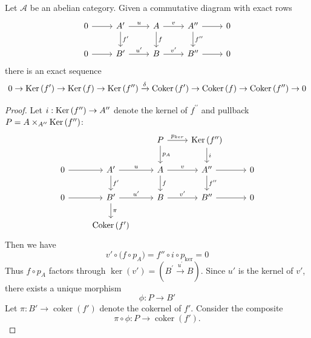 \documentclass[12pt, oneside]{book}
\begin{document}
\begin{lemma}
    \label{lem: snake's lemma}
    Let $\mathcal{A}$ be an abelian category. Given a commutative diagram with exact rows
    \begin{equation*}
        \begin{tikzcd}
            0 \arrow[r] & A' \arrow[r,"u"] \arrow[d,"f^\prime"] & A \arrow[r,"v"]\arrow[d,"f"]  & A^{\prime\prime} \arrow[d,"f^{\prime\prime}"] \arrow[r] & 0 \\
            0 \arrow[r] & B^\prime  \arrow[r,"u^{\prime}"]  & B \arrow[r,"v^{\prime}"]  & B^{\prime\prime} \arrow[r] & 0
        \end{tikzcd}
    \end{equation*}
    there is an exact sequence
    \begin{equation*}
        0 \rightarrow \operatorname{\operatorname{Ker}}\left(f^\prime\right) \rightarrow \operatorname{\operatorname{Ker}}\left(f\right) \rightarrow \operatorname{\operatorname{Ker}}\left(f^{\prime\prime}\right) \xrightarrow{\delta} \operatorname{\operatorname{Coker}}\left(f^\prime\right) \rightarrow \operatorname{\operatorname{Coker}}\left(f\right) \rightarrow \operatorname{\operatorname{Coker}}\left(f^{\prime\prime}\right) \rightarrow 0
    \end{equation*}
    \begin{proof}
        Let $i: \operatorname{\operatorname{Ker}}\left( f^{\prime\prime} \right) \rightarrow A^{\prime\prime}$ denote the kernel of $f^{\prime\prime}$ and
        pullback $P=A\times_{A^{\prime\prime}} \operatorname{\operatorname{Ker}}\left( f^{\prime\prime} \right)$:
        \begin{equation*}
            \begin{tikzcd}
                &&P\arrow[d,"p_A"]\arrow[r,"p_{ker}"]& \Ker\left( f^{\prime\prime} \right) \arrow[d,"i"]&\\
                0 \arrow[r] & A' \arrow[r,"u"] \arrow[d,"f^\prime"] & A \arrow[r,"v"]\arrow[d,"f"]  & A^{\prime\prime} \arrow[d,"f^{\prime\prime}"] \arrow[r] & 0 \\
                0 \arrow[r] & B^\prime \arrow[d,"\pi"]  \arrow[r,"u^{\prime}"]  & B \arrow[r,"v^{\prime}"]  & B^{\prime\prime} \arrow[r] & 0\\
                &\Coker\left( f^\prime \right)&&&
            \end{tikzcd}
        \end{equation*}
        Then we have
        \[
            v' \circ \bigl( f \circ p_A \bigr)
            = f'' \circ  i \circ p_{\ker}
            = 0
        \]
        Thus $f \circ p_A$ factors through $\ker(v') = \left(B^\prime \xrightarrow{u^\prime}B\right)$.
        Since $u'$ is the kernel of $v'$, there exists a unique morphism
        \[
            \phi : P \longrightarrow B'
        \]
        Let $\pi : B' \to \operatorname{coker}(f')$ denote the cokernel of $f'$.
        Consider the composite
        \[
            \pi \circ \phi : P \longrightarrow \operatorname{coker}(f').
        \]


\end{proof}
\end{lemma}
\end{document}
